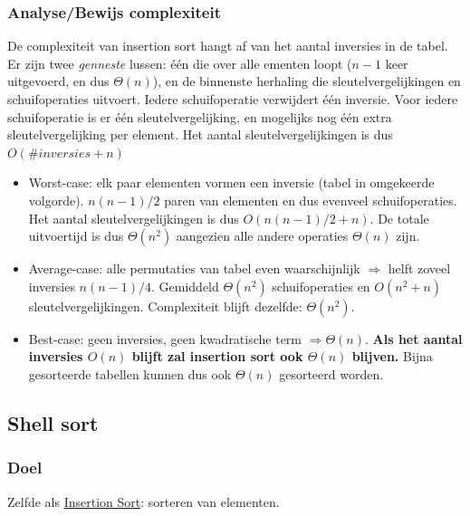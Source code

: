 \documentclass{article}
\begin{document}
\subsubsection{Analyse/Bewijs complexiteit} %
\label{sub:ins_sort_analyse_bewijs_complexiteit}
De complexiteit van insertion sort hangt af van het aantal inversies in de tabel. Er zijn twee \textit{genneste} lussen: één die over alle ementen loopt ($n-1$ keer uitgevoerd, en dus $\Theta(n)$), en de binnenste herhaling die sleutelvergelijkingen en schuifoperaties uitvoert. Iedere schuifoperatie verwijdert één inversie. Voor iedere schuifoperatie is er één sleutelvergelijking, en mogelijks nog één extra sleutelvergelijking per element.
Het aantal sleutelvergelijkingen is dus $O(\#inversies + n)$
\begin{itemize}
	\item Worst-case: elk paar elementen vormen een inversie (tabel in omgekeerde volgorde). $n(n-1)/2$ paren van elementen en dus evenveel schuifoperaties. Het aantal sleutelvergelijkingen is dus $O(n(n-1)/2 + n)$. De totale uitvoertijd is dus $\Theta(n^2)$ aangezien alle andere operaties $\Theta(n)$ zijn.
	\item Average-case: alle permutaties van tabel even waarschijnlijk $\Rightarrow$ helft zoveel inversies $n(n-1)/4$. Gemiddeld $\Theta(n^2)$ schuifoperaties en $O(n^2 + n)$ sleutelvergelijkingen. Complexiteit blijft dezelfde: $\Theta(n^2)$.
	\item Best-case: geen inversies, geen kwadratische term $\Rightarrow \Theta(n)$. \textbf{Als het aantal inversies $O(n)$ blijft zal insertion sort ook $\Theta(n)$ blijven.} Bijna gesorteerde tabellen kunnen dus ook $\Theta(n)$ gesorteerd worden.
\end{itemize}


\subsection{Shell sort} %
\label{sub:shell_sort}
\subsubsection{Doel} %
\label{sub:shell_sort_doel}
Zelfde als \hyperref[sub:insertion_sort]{Insertion Sort}: sorteren van elementen.
\end{document}

